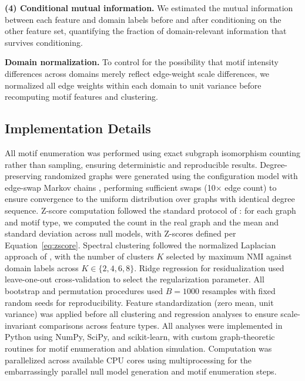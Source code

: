 \textbf{(4) Conditional mutual information.} We estimated the mutual information between each feature and domain labels before and after conditioning on the other feature set, quantifying the fraction of domain-relevant information that survives conditioning.

\textbf{Domain normalization.} To control for the possibility that motif intensity differences across domains merely reflect edge-weight scale differences, we normalized all edge weights within each domain to unit variance before recomputing motif features and clustering.

\subsection{Implementation Details}\label{sec:implementation}
All motif enumeration was performed using exact subgraph isomorphism counting rather than sampling, ensuring deterministic and reproducible results. Degree-preserving randomized graphs were generated using the configuration model with edge-swap Markov chains \cite{milo2002network}, performing sufficient swaps (10$\times$ edge count) to ensure convergence to the uniform distribution over graphs with identical degree sequence. Z-score computation followed the standard protocol of \citet{milo2002network}: for each graph and motif type, we computed the count in the real graph and the mean and standard deviation across null models, with Z-scores defined per Equation~\ref{eq:zscore}. Spectral clustering followed the normalized Laplacian approach of \citet{ng2002spectral}, with the number of clusters $K$ selected by maximum NMI against domain labels across $K \in \{2, 4, 6, 8\}$. Ridge regression for residualization used leave-one-out cross-validation to select the regularization parameter. All bootstrap and permutation procedures used $B=1000$ resamples with fixed random seeds for reproducibility. Feature standardization (zero mean, unit variance) was applied before all clustering and regression analyses to ensure scale-invariant comparisons across feature types. All analyses were implemented in Python using NumPy, SciPy, and scikit-learn, with custom graph-theoretic routines for motif enumeration and ablation simulation. Computation was parallelized across available CPU cores using multiprocessing for the embarrassingly parallel null model generation and motif enumeration steps.